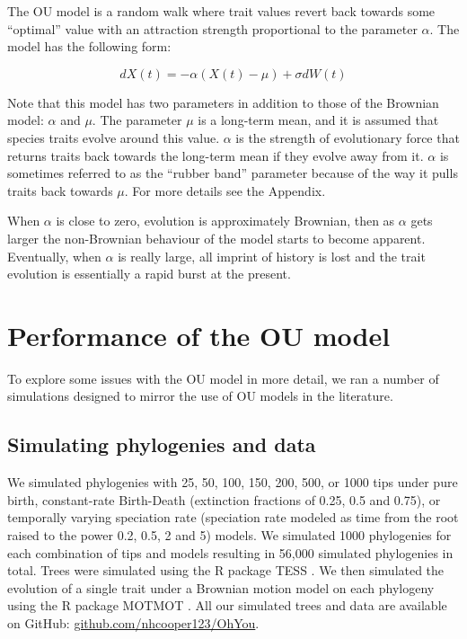 \documentclass[a4paper,12pt]{article}
\begin{document}
   The OU model \citep{hansen1997stabilizing,Butler:2004aa} is a random walk where trait values revert back towards some ``optimal'' value with an attraction strength proportional to the parameter $\alpha$. 
    The model has the following form:
  
      \begin{equation}
        dX(t) = - \alpha (X(t) - \mu) + \sigma dW(t)
      \end{equation}
    
    \noindent
    Note that this model has two parameters in addition to those of the Brownian model: $\alpha$ and $\mu$. 
    The parameter $\mu$ is a long-term mean, and it is assumed that species traits evolve around this value. 
    $\alpha$ is the strength of evolutionary force that returns traits back towards the long-term mean if they evolve away from it. 
    $\alpha$ is sometimes referred to as the ``rubber band'' parameter because of the way it pulls traits back towards $\mu$. For more details see the Appendix.
    
    When $\alpha$ is close to zero, evolution is approximately Brownian, then as $\alpha$ gets larger the non-Brownian behaviour of the model starts to become apparent. 
    Eventually, when $\alpha$ is really large, all imprint of history is lost and the trait evolution is essentially a rapid burst at the present.
  
\section{Performance of the OU model}

  To explore some issues with the OU model in more detail, we ran a number of simulations designed to mirror the use of OU models in the literature.

  \subsection{Simulating phylogenies and data}
    We simulated phylogenies with 25, 50, 100, 150, 200, 500, or 1000 tips under pure birth, constant-rate Birth-Death (extinction fractions of 0.25, 0.5 and 0.75), or temporally varying speciation rate (speciation rate modeled as time from the root raised to the power 0.2, 0.5, 2 and 5) models. 
    We simulated 1000 phylogenies for each combination of tips and models resulting in 56,000 simulated phylogenies in total. 
    Trees were simulated using the R package TESS \citep{hohna2013fast}. 
    We then simulated the evolution of a single trait under a Brownian motion model on each phylogeny using the R package MOTMOT \citep{Thomas:2011aa}. 
    All our simulated trees and data are available on GitHub: \href{https://github.com/nhcooper123/OhYou}{github.com/nhcooper123/OhYou}.
\end{document}
